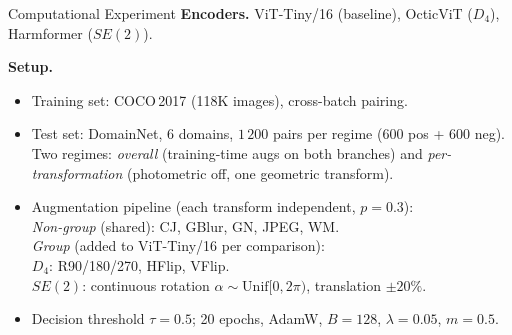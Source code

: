 \documentclass[aspectratio=169]{beamer}
\begin{document}
\begin{frame}{Computational Experiment}
    \textbf{Encoders.}
    ViT-Tiny/16 (baseline), OcticViT ($D_4$), Harmformer ($SE(2)$).
    \medskip

    \textbf{Setup.}
    \begin{itemize}
        \item Training set: COCO\,2017 (118K images), cross-batch pairing.
        \item Test set: DomainNet, 6 domains, $1\,200$ pairs per regime ($600$ pos + $600$ neg).
        Two regimes: \emph{overall} (training-time augs on both branches) and \emph{per-transformation} (photometric off, one geometric transform).
        \item Augmentation pipeline (each transform independent, $p=0.3$):\\
              \textit{Non-group} (shared): {\small CJ, GBlur, GN, JPEG, WM.}\\
              \textit{Group} (added to ViT-Tiny/16 per comparison):\\
              {\small $D_4$: R90/180/270, HFlip, VFlip.}\\
              {\small $SE(2)$: continuous rotation $\alpha\!\sim\!\mathrm{Unif}[0,2\pi)$, translation $\pm 20\%$.}
        \item Decision threshold $\tau=0.5$; 20 epochs, AdamW, $B=128$, $\lambda=0.05$, $m=0.5$.
    \end{itemize}
\end{frame}
\end{document}
